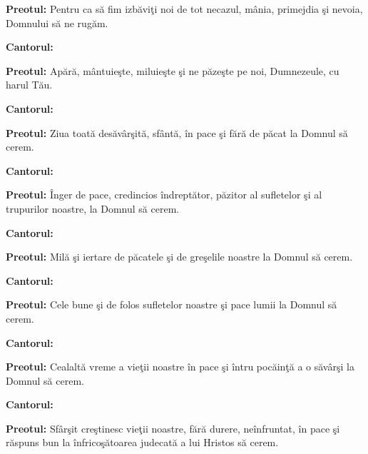 \documentclass[11pt,letterpaper]{book} \usepackage{ucs}
\begin{document}
  {\bf Preotul:} Pentru ca să fim izbăviţi noi de tot necazul, mânia,
  primejdia şi nevoia, Domnului să ne rugăm.

  {\bf Cantorul:}
  \begin{center}
  \end{center}

  {\bf Preotul:} Apără, mântuieşte, miluieşte şi ne păzeşte pe noi,
  Dumnezeule, cu harul Tău.

  {\bf Cantorul:}
  \begin{center}
  \end{center}

  {\bf Preotul:} Ziua toată desăvârşită, sfântă, în pace şi fără de
  păcat la Domnul să cerem.

  {\bf Cantorul:}
  \begin{center}
  \end{center}  

  {\bf Preotul:} Înger de pace, credincios îndreptător, păzitor al
  sufletelor şi al trupurilor noastre, la Domnul să cerem.

  {\bf Cantorul:}
  \begin{center}
  \end{center}  

  {\bf Preotul:} Milă şi iertare de păcatele şi de greşelile noastre
  la Domnul să cerem.

  {\bf Cantorul:}
  \begin{center}
  \end{center}  

  {\bf Preotul:} Cele bune şi de folos sufletelor noastre şi pace
  lumii la Domnul să cerem.

  {\bf Cantorul:}
  \begin{center}
  \end{center}  

  {\bf Preotul:} Cealaltă vreme a vieţii noastre în pace şi întru
  pocăinţă a o săvârşi la Domnul să cerem.

  {\bf Cantorul:}
  \begin{center}
  \end{center}  

  {\bf Preotul:} Sfârşit creştinesc vieţii noastre, fără durere,
  neînfruntat, în pace şi răspuns bun la înfricoşătoarea judecată a
  lui Hristos să cerem.
\end{document}
